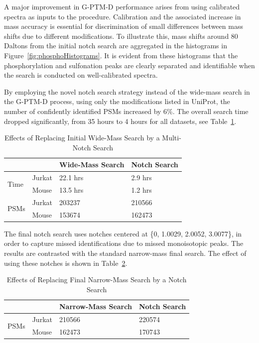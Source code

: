\documentclass[journal=jprobs,manuscript=article]{achemso}
\begin{document}
A major improvement in G-PTM-D performance arises from using calibrated spectra as inputs to the procedure. 
Calibration and the associated increase in mass accuracy is essential for discrimination of small differences between mass shifts due to different modifications.
To illustrate this, mass shifts around 80 Daltons from the initial notch search are aggregated in the histograms in Figure~\ref{fig:phosphoHistograms}.
It is evident from these histograms that the phosphorylation and sulfonation peaks are clearly separated and identifiable when the search is conducted on well-calibrated spectra.

By employing the novel notch search strategy instead of the wide-mass search in the G-PTM-D process, using only the modifications listed in UniProt, the number of confidently identified PSMs increased by 6\%.
The overall search time dropped significantly, from 35 hours to 4 hours for all datasets, see Table~\ref{my-labelff}.

\begin{table}[]
\centering
\caption{Effects of Replacing Initial Wide-Mass Search by a Multi-Notch Search}
\label{my-labelff}
\begin{tabular}{ll|l|l}
                      &        & Wide-Mass Search & Notch Search\\
\hline
\multirow{2}{*}{Time} & Jurkat & 22.1 hrs         & 2.9 hrs    \\
                      & Mouse  & 13.5 hrs         & 1.2 hrs   \\
\hline
\multirow{2}{*}{PSMs} & Jurkat & 203237           & 210566    \\
                      & Mouse  & 153674           & 162473   
\end{tabular}
\end{table}


The final notch search uses notches centered at \{0, 1.0029, 2.0052, 3.0077\}, in order to capture missed identifications due to missed monoisotopic peaks.
The results are contrasted with the standard narrow-mass final search.
The effect of using these notches is shown in Table~\ref{tab:table2}.

\begin{table}[]
\centering
\caption{Effects of Replacing Final Narrow-Mass Search by a Notch Search}
\label{tab:table2}
\begin{tabular}{ll|l|l}
                      &        & Narrow-Mass Search & Notch Search\\
\hline
\multirow{2}{*}{PSMs} & Jurkat  & 210566   &  220574  \\
                      & Mouse    & 162473   &   170743
\end{tabular}
\end{table}
\end{document}
